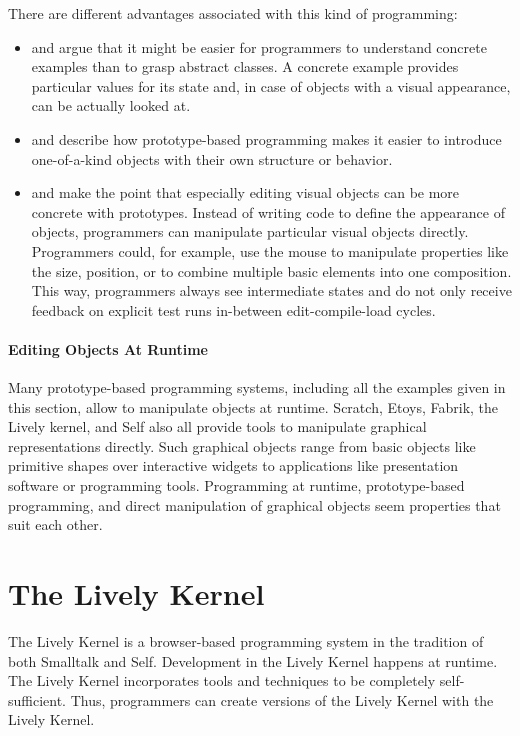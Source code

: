 There are different advantages associated with this kind of programming:
\begin{itemize}
    \item \cite{Taivalsaari1996CVP} and \cite{Ungar1987SPS} argue that it might be easier for programmers to understand concrete examples than to grasp abstract classes. A concrete example provides particular values for its state and, in case of objects with a visual appearance, can be actually looked at.
    \item \cite{Ungar1987SPS} and \cite{Borning1986CVP} describe how prototype-based programming makes it easier to introduce one-of-a-kind objects with their own structure or behavior.
    \item \cite{Borning1986CVP} and \cite{Maloney1995Mor} make the point that especially editing visual objects can be more concrete with prototypes. Instead of writing code to define the appearance of objects, programmers can manipulate particular visual objects directly. Programmers could, for example, use the mouse to manipulate properties like the size, position, or to combine multiple basic elements into one composition. This way, programmers always see intermediate states and do not only receive feedback on explicit test runs in-between edit-compile-load cycles. 
\end{itemize}

\paragraph{Editing Objects At Runtime}
Many prototype-based programming systems, including all the examples given in this section, allow to manipulate objects at runtime.
Scratch, Etoys, Fabrik, the Lively kernel, and Self also all provide tools to manipulate graphical representations directly.
Such graphical objects range from basic objects like primitive shapes over interactive widgets to applications like presentation software or programming tools.
Programming at runtime, prototype-based programming, and direct manipulation of graphical objects seem properties that suit each other.


\section{The Lively Kernel}

The Lively Kernel is a browser-based programming system in the tradition of both Smalltalk and Self.
Development in the Lively Kernel happens at runtime.
The Lively Kernel incorporates tools and techniques to be completely self-sufficient.
Thus, programmers can create versions of the Lively Kernel with the Lively Kernel.

